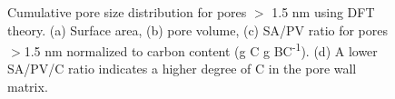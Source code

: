 \begin{figure}[!ht]
\hfill
{}
\hfill
{}
\hfill
{}
\caption{Cumulative pore size distribution for pores $>$ 1.5 nm using DFT theory. (a) Surface area, (b) pore volume, (c) SA/PV ratio for pores $>$1.5 nm normalized to carbon content (g C g BC\textsuperscript{-1}). (d) A lower SA/PV/C ratio indicates a higher degree of C in the pore wall matrix.}
\label{fig:PZD_large}
\end{figure}


